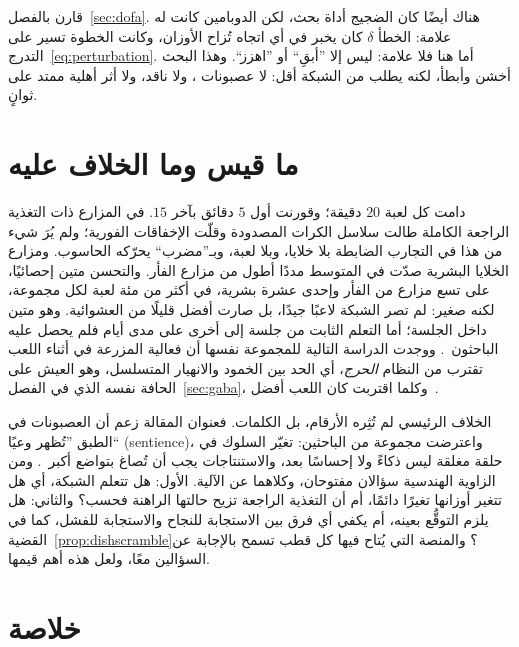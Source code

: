 قارن بالفصل~\ref{sec:dofa}. هناك أيضًا كان الضجيج أداة بحث، لكن الدوبامين كانت له علامة: الخطأ $\delta$ كان يخبر في أي اتجاه تُزاح الأوزان، وكانت الخطوة تسير على التدرج~\eqref{eq:perturbation}. أما هنا فلا علامة: ليس إلا ”أبقِ“ أو ”اهزز“. وهذا البحث أخشن وأبطأ، لكنه يطلب من الشبكة أقل: لا عصبونات ، ولا ناقد، ولا أثر أهلية ممتد على ثوانٍ.

\section{ما قيس وما الخلاف عليه}

دامت كل لعبة $20$ دقيقة؛ وقورنت أول $5$ دقائق بآخر $15$. في المزارع ذات التغذية الراجعة الكاملة طالت سلاسل الكرات المصدودة وقلّت الإخفاقات الفورية؛ ولم يُرَ شيء من هذا في التجارب الضابطة بلا خلايا، وبلا لعبة، وبـ”مضرب“ يحرّكه الحاسوب. ومزارع الخلايا البشرية صدّت في المتوسط مددًا أطول من مزارع الفأر. والتحسن متين إحصائيًا، على تسع مزارع من الفأر وإحدى عشرة بشرية، في أكثر من مئة لعبة لكل مجموعة، لكنه صغير: لم تصر الشبكة لاعبًا جيدًا، بل صارت أفضل قليلًا من العشوائية. وهو متين داخل الجلسة؛ أما التعلم الثابت من جلسة إلى أخرى على مدى أيام فلم يحصل عليه الباحثون~\cite{Kagan2022}. ووجدت الدراسة التالية للمجموعة نفسها أن فعالية المزرعة في أثناء اللعب تقترب من النظام \emph{الحرج}، أي الحد بين الخمود والانهيار المتسلسل، وهو العيش على الحافة نفسه الذي في الفصل~\ref{sec:gaba}، وكلما اقتربت كان اللعب أفضل~\cite{Habibollahi2023}.

الخلاف الرئيسي لم تُثِره الأرقام، بل الكلمات. فعنوان المقالة زعم أن العصبونات في الطبق ”تُظهر وعيًا“ (\foreignlanguage{english}{sentience})، واعترضت مجموعة من الباحثين: تغيّر السلوك في حلقة مغلقة ليس ذكاءً ولا إحساسًا بعد، والاستنتاجات يجب أن تُصاغ بتواضع أكبر~\cite{Balci2023}. ومن الزاوية الهندسية سؤالان مفتوحان، وكلاهما عن الآلية. الأول: هل تتعلم الشبكة، أي هل تتغير أوزانها تغيرًا دائمًا، أم أن التغذية الراجعة تزيح حالتها الراهنة فحسب؟ والثاني: هل يلزم التوقُّع بعينه، أم يكفي أي فرق بين الاستجابة للنجاح والاستجابة للفشل، كما في القضية~\ref{prop:dishscramble}؟ والمنصة التي يُتاح فيها كل قطب تسمح بالإجابة عن السؤالين معًا، ولعل هذه أهم قيمها.



\section{خلاصة}

